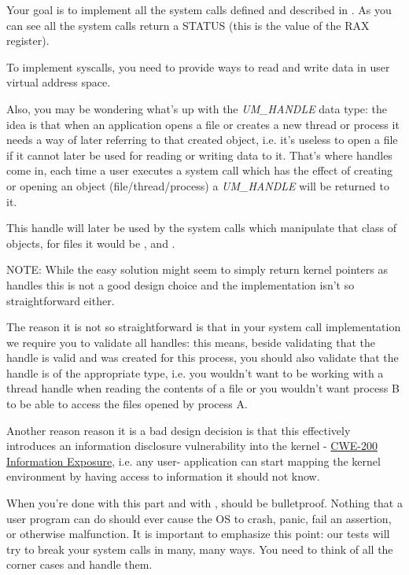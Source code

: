 Your goal is to implement all the system calls defined and described in . As
you can see all the system calls return a STATUS (this is the value of the RAX register).

To implement syscalls, you need to provide ways to read and write data in user virtual
address space.

Also, you may be wondering what's up with the \textit{UM\_HANDLE} data type: the idea is that when
an application opens a file or creates a new thread or process it needs a way of later referring to
that created object, i.e. it's useless to open a file if it cannot later be used for reading or
writing data to it. That's where handles come in, each time a user executes a system call which has
the effect of creating or opening an object (file/thread/process) a \textit{UM\_HANDLE} will be
returned to it.

This handle will later be used by the system calls which manipulate that class of objects, for files
it would be ,  and .

NOTE: While the easy solution might seem to simply return kernel pointers as handles this is
 not a good design choice and the implementation isn't so straightforward either.

The reason it is not so straightforward is that in your system call implementation we require you to
validate all handles: this means, beside validating that the handle is valid and was created for
this process, you should also validate that the handle is of the appropriate type, i.e. you wouldn't
want to be working with a thread handle when reading the contents of a file or you wouldn't want
process B to be able to access the files opened by process A.

Another reason reason it is a bad design decision is that this effectively introduces an
information disclosure vulnerability into the kernel - 
\href{https://cwe.mitre.org/data/definitions/200.html}{CWE-200 Information Exposure}, i.e. any user-
application can start mapping the kernel environment by having access to information it should
not know.

When you're done with this part and with , \projectname should be
bulletproof. Nothing that a user program can do should ever cause the OS to crash, panic, fail an
assertion, or otherwise malfunction. It is important to emphasize this point: our tests will try to
break your system calls in many, many ways. You need to think of all the corner cases and handle
them.

